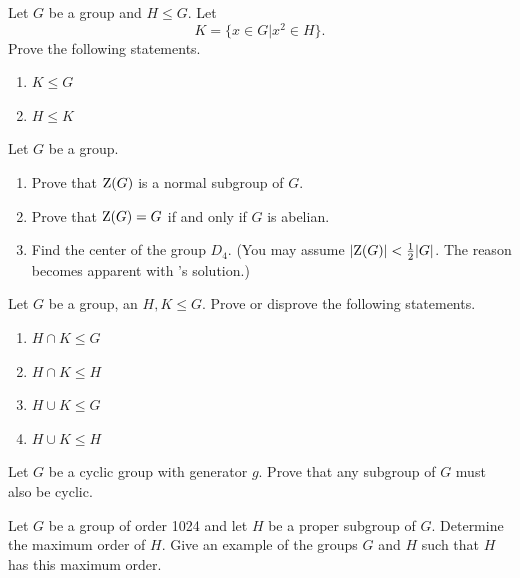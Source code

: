 \begin{problem}
    Let $G$ be a group and $H \leq G$. Let
    \[
        K = \{x \in G \vert x^2 \in H\}.
    \]
    Prove the following statements.
    \begin{enumerate}[label=(\alph*)]
        \item $K \leq G$
        \item $H \leq K$
    \end{enumerate}
\end{problem}

\begin{problem}\label{problem-center-of-G}
    Let $G$ be a group.
    \begin{enumerate}[label=(\alph*)]
        \item Prove that $\mathrm{Z}(G)$ is a normal subgroup of $G$.
        \item Prove that $\mathrm{Z}(G) = G$ if and only if $G$ is abelian.
        \item Find the center of the group $D_4$.\newline
        (You may assume $|\mathrm{Z}(G)| < \frac12 |G|$. The reason becomes apparent with 's solution.)
    \end{enumerate}
\end{problem}

\newpage

\begin{problem}\label{problem-intersection-of-subgroups}
    Let $G$ be a group, an $H, K \leq G$. Prove or disprove the following statements.
    \begin{enumerate}[label=(\alph*)]
        \item $H \cap K \leq G$
        \item $H \cap K \leq H$
        \item $H \cup K \leq G$
        \item $H \cup K \leq H$
    \end{enumerate}
\end{problem}

\begin{problem}\label{problem-subgroup-of-cyclic-group-is-cyclic}
    Let $G$ be a cyclic group with generator $g$. Prove that any subgroup of $G$ must also be cyclic.
\end{problem}

\begin{problem}
    Let $G$ be a group of order 1024 and let $H$ be a proper subgroup of $G$. Determine the maximum order of $H$. Give an example of the groups $G$ and $H$ such that $H$ has this maximum order.
\end{problem}

